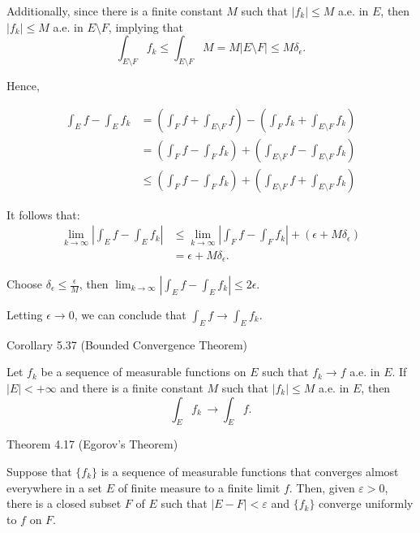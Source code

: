 \documentclass[UTF8,a4paper,10pt]{article}
\begin{document}
Additionally, since there is a finite constant $M$ such that $|f_k| \leq M$ a.e. in $E$, then $|f_k| \leq M$ a.e. in $E\setminus F$, implying that
\[
  \int_{E\setminus F} f_k \leq \int_{E\setminus F} M = M |E\setminus F| \leq M\delta_{\epsilon}.
\]

Hence,

\begin{align*}
  \int_{E} f - \int_{E} f_k &= \left(\int_{F} f+\int_{E\setminus F} f\right) -  \left(\int_{F} f_k + \int_{E\setminus F} f_k\right)\\
  &= \left(\int_{F} f-\int_{F} f_k \right)+\left(\int_{E\setminus F} f- \int_{E\setminus F} f_k \right)\\
  &\leq \left(\int_{F} f-\int_{F} f_k \right)+\left(\int_{E\setminus F} f + \int_{E\setminus F} f_k\right)
\end{align*}

It follows that:
\begin{align*}
  \lim_{k\to \infty}\left| \int_{E} f - \int_{E} f_k \right| 
  &\leq \lim_{k\to \infty}\left|\int_{F} f-\int_{F} f_k \right| +\left(\epsilon + M\delta_{\epsilon}\right)\\
  & = \epsilon + M\delta_{\epsilon}.
\end{align*}

Choose \(\delta_{\epsilon} \leq \frac{\epsilon}{M}\), then
\(\lim_{k\to \infty}\left| \int_{E} f - \int_{E} f_k \right| \leq 2\epsilon\). 

Letting \(\epsilon\to 0\), we can conclude that \(\int_{E} f \to \int_{E} f_k \).

\pagebreak

\begin{mybox}{Corollary 5.37 (Bounded Convergence Theorem)}

    Let $f_k$ be a sequence of measurable functions on $E$ such that $f_k \to f$ a.e. in $E$. If $|E| < +\infty$ and there is a finite constant $M$ such that $|f_k| \leq M$ a.e. in $E$, then
    \[
      \int_E f_k \,\to \int_E f .
    \]

\pagebreak

\end{mybox}

\begin{mybox}{Theorem 4.17 (Egorov's Theorem)}

  Suppose that $\{f_k\}$ is a sequence of measurable functions that converges almost everywhere in a set $E$ of finite measure to a finite limit $f$. Then, given $\varepsilon > 0$, there is a closed subset $F$ of $E$ such that $|E - F| < \varepsilon$ and $\{f_k\}$ converge uniformly to $f$ on $F$.

\end{mybox}
\end{document}
